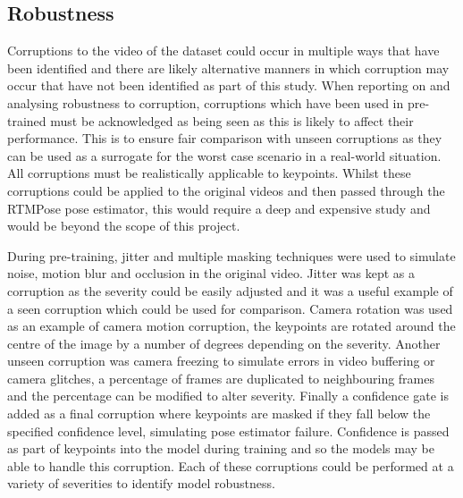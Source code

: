 \documentclass{article}
\begin{document}
\subsection{Robustness}
Corruptions to the video of the dataset could occur in multiple ways that have been identified and there are likely alternative manners in which corruption may occur that have not been identified as part of this study. When reporting on and analysing robustness to corruption, corruptions which have been used in pre-trained must be acknowledged as being seen as this is likely to affect their performance. This is to ensure fair comparison with unseen corruptions as they can be used as a surrogate for the worst case scenario in a real-world situation. All corruptions must be realistically applicable to keypoints. Whilst these corruptions could be applied to the original videos and then passed through the RTMPose pose estimator, this would require a deep and expensive study and would be beyond the scope of this project.

During pre-training, jitter and multiple masking techniques were used to simulate noise, motion blur and occlusion in the original video. Jitter was kept as a corruption as the severity could be easily adjusted and it was a useful example of a seen corruption which could be used for comparison. Camera rotation was used as an example of camera motion corruption, the keypoints are rotated around the centre of the image by a number of degrees depending on the severity. Another unseen corruption was camera freezing to simulate errors in video buffering or camera glitches, a percentage of frames are duplicated to neighbouring frames and the percentage can be modified to alter severity. Finally a confidence gate is added as a final corruption where keypoints are masked if they fall below the specified confidence level, simulating pose estimator failure. Confidence is passed as part of keypoints into the model during training and so the models may be able to handle this corruption. Each of these corruptions could be performed at a variety of severities to identify model robustness. 
\end{document}
